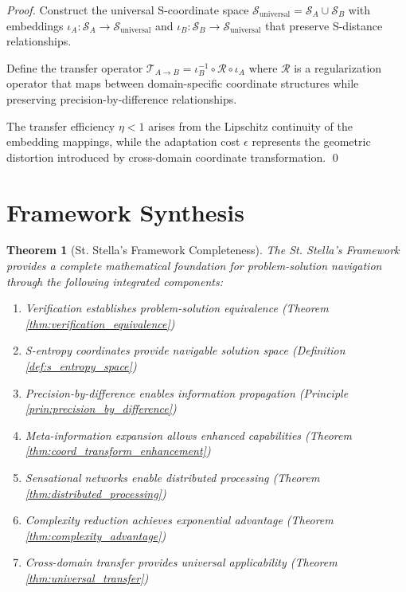 \documentclass[12pt,a4paper]{article}
\newtheorem{theorem}{Theorem}
\begin{document}
\begin{proof}
Construct the universal S-coordinate space $\mathcal{S}_{\text{universal}} = \mathcal{S}_A \cup \mathcal{S}_B$ with embeddings $\iota_A: \mathcal{S}_A \to \mathcal{S}_{\text{universal}}$ and $\iota_B: \mathcal{S}_B \to \mathcal{S}_{\text{universal}}$ that preserve S-distance relationships.

Define the transfer operator $\mathcal{T}_{A \to B} = \iota_B^{-1} \circ \mathcal{R} \circ \iota_A$ where $\mathcal{R}$ is a regularization operator that maps between domain-specific coordinate structures while preserving precision-by-difference relationships.

The transfer efficiency $\eta < 1$ arises from the Lipschitz continuity of the embedding mappings, while the adaptation cost $\epsilon$ represents the geometric distortion introduced by cross-domain coordinate transformation. \qed
\end{proof}

\section{Framework Synthesis}

\begin{theorem}[St. Stella's Framework Completeness]
\label{thm:framework_completeness}
The St. Stella's Framework provides a complete mathematical foundation for problem-solution navigation through the following integrated components:
\begin{enumerate}
\item Verification establishes problem-solution equivalence (Theorem \ref{thm:verification_equivalence})
\item S-entropy coordinates provide navigable solution space (Definition \ref{def:s_entropy_space})
\item Precision-by-difference enables information propagation (Principle \ref{prin:precision_by_difference})
\item Meta-information expansion allows enhanced capabilities (Theorem \ref{thm:coord_transform_enhancement})
\item Sensational networks enable distributed processing (Theorem \ref{thm:distributed_processing})
\item Complexity reduction achieves exponential advantage (Theorem \ref{thm:complexity_advantage})
\item Cross-domain transfer provides universal applicability (Theorem \ref{thm:universal_transfer})
\end{enumerate}
\end{theorem}
\end{document}
